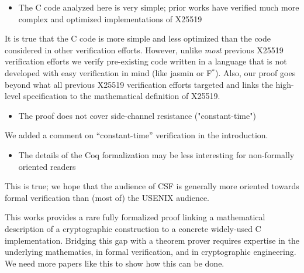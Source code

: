 \begin{center}
\end{center}

\begin{itemize}
    \item The C code analyzed here is very simple; prior works have verified much more complex and optimized implementations of X25519
\end{itemize}
\begin{answer}
  It is true that the C code is more simple and less optimized than the code considered in other verification efforts.
  However, unlike \emph{most} previous X25519 verification efforts we verify pre-existing code written in a language
  that is not developed with easy verification in mind (like jasmin or F$^*$). 
  Also, our proof goes beyond what all previous X25519 verification efforts targeted and links the
  high-level specification to the mathematical definition of X25519.
\end{answer}
\begin{itemize}
    \item The proof does not cover side-channel resistance ("constant-time")
\end{itemize}
\begin{answer}
  We added a comment on ``constant-time'' verification in the introduction. 
\end{answer}
\begin{itemize}
    \item The details of the Coq formalization may be less interesting for non-formally oriented readers
\end{itemize}
\begin{answer}
  This is true; we hope that the audience of CSF is generally more oriented towards formal verification
  than (most of) the USENIX audience.
\end{answer}

\begin{center}
\end{center}
This works provides a rare fully formalized proof linking a mathematical description of a cryptographic construction to a concrete widely-used C implementation. Bridging this gap with a theorem prover requires expertise in the underlying mathematics, in formal verification, and in cryptographic engineering. We need more papers like this to show how this can be done.

